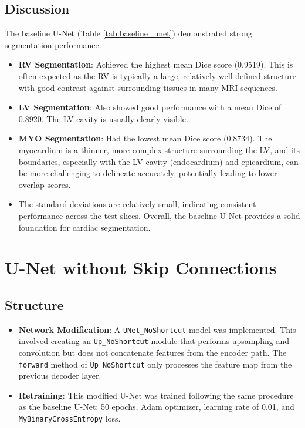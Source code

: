 \documentclass{article}
\begin{document}
\subsection{Discussion}
The baseline U-Net (Table \ref{tab:baseline_unet}) demonstrated strong segmentation performance.
\begin{itemize}
  \item \textbf{RV Segmentation}: Achieved the highest mean Dice score (0.9519). This is often expected as the RV is typically a large, relatively well-defined structure with good contrast against surrounding tissues in many MRI sequences.
  \item \textbf{LV Segmentation}: Also showed good performance with a mean Dice of 0.8920. The LV cavity is usually clearly visible.
  \item \textbf{MYO Segmentation}: Had the lowest mean Dice score (0.8734). The myocardium is a thinner, more complex structure surrounding the LV, and its boundaries, especially with the LV cavity (endocardium) and epicardium, can be more challenging to delineate accurately, potentially leading to lower overlap scores.
  \item The standard deviations are relatively small, indicating consistent performance across the test slices. Overall, the baseline U-Net provides a solid foundation for cardiac segmentation.
\end{itemize}


\section{U-Net without Skip Connections}

\subsection{Structure}
\begin{itemize}
  \item \textbf{Network Modification}: A \texttt{UNet\_NoShortcut} model was implemented. This involved creating an
        \texttt{Up\_NoShortcut} module that performs upsampling and convolution but does not concatenate features from the encoder
        path. The \texttt{forward} method of \texttt{Up\_NoShortcut} only processes the feature map from the previous decoder layer.
  \item \textbf{Retraining}: This modified U-Net was trained following the same procedure as the baseline U-Net: 50 epochs, Adam optimizer, learning rate of 0.01, and \texttt{MyBinaryCrossEntropy} loss.
\end{itemize}
\end{document}
